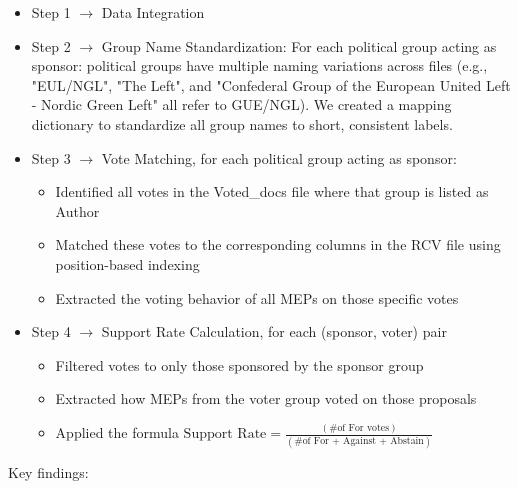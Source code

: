 \documentclass[a4paper]{scrartcl}
\begin{document}
\begin{itemize}
    \item Step 1 $\rightarrow$ Data Integration
    \item Step 2 $\rightarrow$ Group Name Standardization: For each political group acting as sponsor: political groups have multiple naming variations across files (e.g., "EUL/NGL", "The Left", and "Confederal Group of the European United Left - Nordic Green Left" all refer to GUE/NGL). We created a mapping dictionary to standardize all group names to short, consistent labels.
    \item Step 3 $\rightarrow$ Vote Matching, for each political group acting as sponsor:
    \begin{itemize}
        \item Identified all votes in the Voted\_docs file where that group is listed as Author
        \item Matched these votes to the corresponding columns in the RCV file using position-based indexing
        \item Extracted the voting behavior of all MEPs on those specific votes
    \end{itemize}
    \item Step 4 $\rightarrow$ Support Rate Calculation, for each (sponsor, voter) pair
    \begin{itemize}
        \item Filtered votes to only those sponsored by the sponsor group
        \item Extracted how MEPs from the voter group voted on those proposals
        \item Applied the formula $\text{Support Rate} = \frac{(\text{\# of For votes})}{(\text{\# of For + Against + Abstain})}$
    \end{itemize}
\end{itemize}
Key findings:
\end{document}
